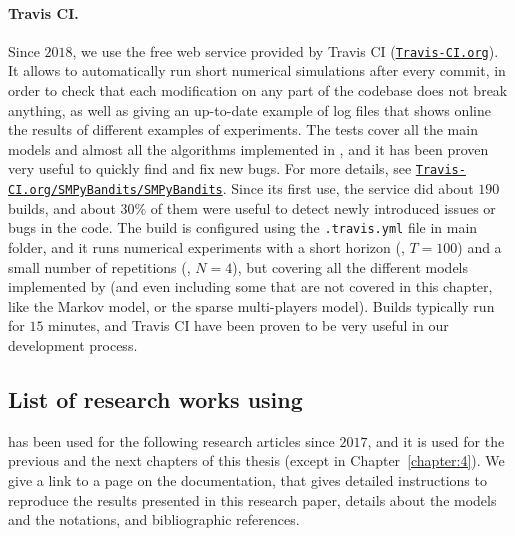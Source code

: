 \paragraph{Travis CI.}
Since $2018$, we use the free web service provided by Travis CI (\href{https://travis-ci.org/}{\texttt{Travis-CI.org}}).
It allows to automatically run short numerical simulations after every commit,
in order to check that each modification on any part of the codebase does not break anything, as well as giving an up-to-date example of log files that shows online the results of different examples of experiments. The tests cover all the main models and almost all the algorithms implemented in \SMPyBandits, and it has been proven very useful to quickly find and fix new bugs.
For more details, see \href{https://travis-ci.org/SMPyBandits/SMPyBandits}{\texttt{Travis-CI.org/SMPyBandits/SMPyBandits}}.
%
Since its first use, the service did about $190$ builds, and about $30\%$ of them were useful to detect newly introduced issues or bugs in the code.
The build is configured using the \texttt{.travis.yml} file in \SMPyBandits{} main folder, and it runs numerical experiments with a short horizon (\eg, $T=100$) and a small number of repetitions (\ie, $N=4$), but covering all the different models implemented by \SMPyBandits{} (and even including some that are not covered in this chapter, like the Markov model, or the sparse multi-players model).
Builds typically run for $15$ minutes, and Travis CI have been proven to be very useful in our development process.



\subsection{List of research works using \SMPyBandits}
\label{sub:3:listResearchWorksUsingSMPyBandits}

\SMPyBandits{} has been used for the following research articles since $2017$, and it is used for the previous and the next chapters of this thesis (except in Chapter~\ref{chapter:4}).
%
We give a link to a page on the documentation, that gives detailed instructions to reproduce the results presented in this research paper, details about the models and the notations, and bibliographic references.

